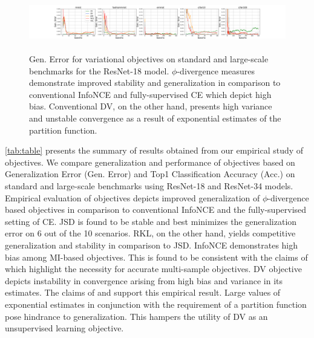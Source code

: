 \documentclass{article}
\begin{document}
\begin{figure}[ht]
\centering
  \includegraphics[height=2.5cm,width=14cm]{18_gen_error.png}
  \caption{Gen. Error for variational objectives on standard and large-scale benchmarks for the ResNet-18 model. $\phi$-divergence measures demonstrate improved stability and generalization in comparison to conventional InfoNCE and fully-supervised CE which depict high bias. Conventional DV, on the other hand, presents high variance and unstable convergence as a result of exponential estimates of the partition function.}
  \label{fig:plot}
\end{figure}
\autoref{tab:table} presents the summary of results obtained from our empirical study of objectives. We compare generalization and performance of objectives based on Generalization Error (Gen. Error) and Top1 Classification Accuracy (Acc.) on standard and large-scale benchmarks using ResNet-18 and ResNet-34 models. Empirical evaluation of objectives depicts improved generalization of $\phi$-divergence based objectives in comparison to conventional InfoNCE and the fully-supervised setting of CE. JSD is found to be stable and best minimizes the generalization error on 6 out of the 10 scenarios. RKL, on the other hand, yields competitive generalization and stability in comparison to JSD. InfoNCE demonstrates high bias among MI-based objectives. This is found to be consistent with the claims of \cite{variational} which highlight the necessity for accurate multi-sample objectives. DV objective depicts instability in convergence arising from high bias and variance in its estimates. The claims of \cite{variational} and \cite{infomax} support this empirical result. Large values of exponential estimates in conjunction with the requirement of a partition function pose hindrance to generalization. This hampers the utility of DV as an unsupervised learning objective. 
\end{document}
